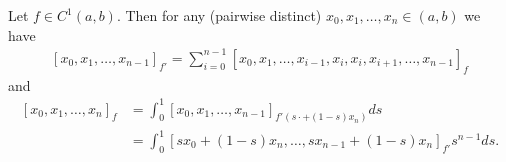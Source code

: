 \begin{lem}
	Let $f \in C^{1}(a, b)$. Then for any (pairwise distinct) $x_{0}, x_{1}, \ldots, x_{n} \in (a, b)$ we have
	\begin{align}\label{derivative_divdif}
		[x_{0}, x_{1}, \ldots, x_{n - 1}]_{f'} = \sum_{i = 0}^{n - 1} [x_{0}, x_{1}, \ldots, x_{i - 1}, x_{i}, x_{i}, x_{i + 1}, \ldots, x_{n - 1}]_{f}
	\end{align}
	and
	\begin{align}\label{integral_divdif}
		[x_{0}, x_{1}, \ldots, x_{n}]_{f} &= \int_{0}^{1} [x_{0}, x_{1}, \ldots, x_{n - 1}]_{f'(s \cdot + (1 - s) x_{n})} ds \\
		&= \int_{0}^{1} [s x_{0} + (1 - s) x_{n}, \ldots, s x_{n - 1} + (1 - s) x_{n}]_{f'} s^{n - 1} d s \nonumber.
	\end{align}
\end{lem}
